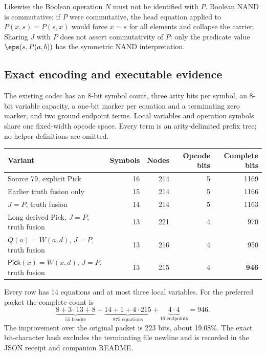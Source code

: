 Likewise the Boolean operation $N$ must not be identified with $P$. Boolean
NAND is commutative; if $P$ were commutative, the head equation applied to
$P(x,s)=P(s,x)$ would force $x=s$ for all elements and collapse the carrier.
Sharing $J$ with $P$ does not assert commutativity of $P$: only the predicate
value $\eps(s,P(a,b))$ has the symmetric NAND interpretation.

\subsection{Exact encoding and executable evidence}

The existing codec has an 8-bit symbol count, three arity bits per symbol,
an 8-bit variable capacity, a one-bit marker per equation and a terminating
zero marker, and two ground endpoint terms. Local variables and operation
symbols share one fixed-width opcode space. Every term is an arity-delimited
prefix tree; no helper definitions are omitted.

\begin{center}
\begin{tabular}{lrrrr}
\toprule
Variant & Symbols & Nodes & Opcode bits & Complete bits\\
\midrule
Source 79, explicit Pick &16&214&5&1169\\
Earlier truth fusion only &15&214&5&1166\\
$J=P$, truth fusion &14&214&5&1163\\
Long derived Pick, $J=P$, truth fusion &13&221&4&970\\
$Q(a)=W(a,d)$, $J=P$, truth fusion &13&216&4&950\\
$\mathsf{Pick}(x)=W(x,d)$, $J=P$, truth fusion &13&215&4&\textbf{946}\\
\bottomrule
\end{tabular}
\end{center}

Every row has 14 equations and at most three local variables. For the
preferred packet the complete count is
\[
 \underbrace{8+3\cdot13+8}_{55\text{ header}}
 +\underbrace{14+1+4\cdot215}_{875\text{ equations}}
 +\underbrace{4\cdot4}_{16\text{ endpoints}}=946.
\]
The improvement over the original packet is 223 bits, about 19.08\%.
The exact bit-character hash excludes the terminating file newline and is
recorded in the JSON receipt and companion README.

